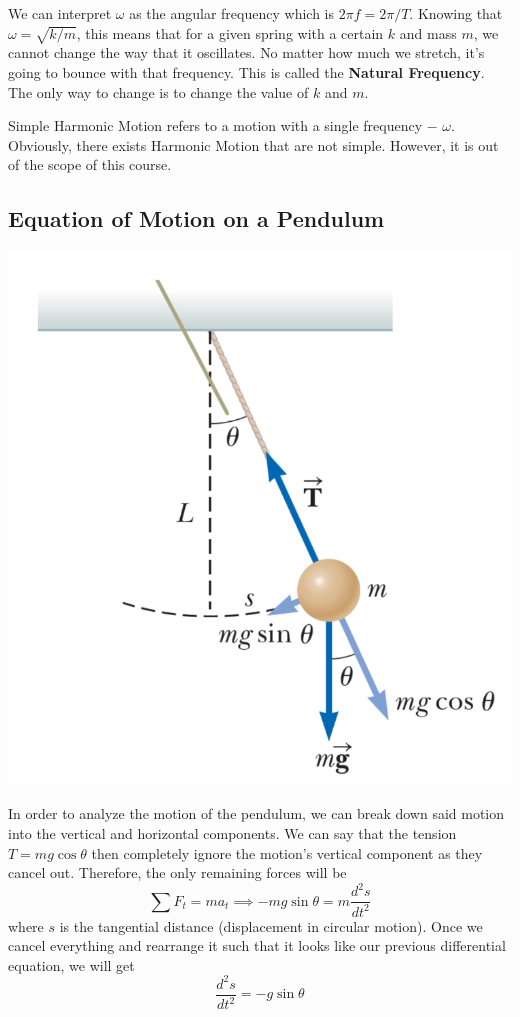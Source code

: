 We can interpret $\omega$ as the angular frequency which is $2\pi f = 2\pi / T$.
Knowing that $\omega = \sqrt{k/m}$, this means that for a given spring with a certain $k$ and mass $m$,
we cannot change the way that it oscillates. No matter how much we stretch, it's going to bounce with
that frequency. This is called the \textbf{Natural Frequency}. The only way to change is to change 
the value of $k$ and $m$.

Simple Harmonic Motion refers to a motion with a single frequency $-$ $\omega$.
Obviously, there exists Harmonic Motion that are not simple. However, it is out of the scope of this course.

\subsection{Equation of Motion on a Pendulum}

\begin{center}
\includegraphics[scale=0.3]{images/oaw/pendulum01.png}
\end{center}

In order to analyze the motion of the pendulum, we can break down said motion into the vertical and
horizontal components. We can say that the tension $T = mg\cos\theta$ then completely ignore the motion's
vertical component as they cancel out. Therefore, the only remaining forces will be
\[\sum F_t = ma_t \implies -mg\sin\theta = m\frac{d^2s}{dt^2}\]
where $s$ is the tangential distance (displacement in circular motion). Once we cancel everything
and rearrange it such that it looks like our previous differential equation, we will get
\[ \frac{d^2s}{dt^2} = -g\sin\theta \]

